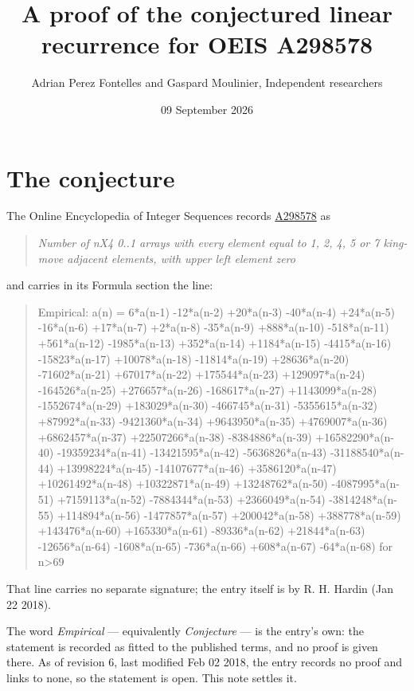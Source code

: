 \documentclass[11pt]{article}
\title{A proof of the conjectured linear recurrence for OEIS A298578}
\author{Adrian Perez Fontelles and Gaspard Moulinier, Independent researchers}
\date{09 September 2026}
\theoremstyle{definition}
\begin{document}
\maketitle
\section{The conjecture}

The Online Encyclopedia of Integer Sequences records \href{https://oeis.org/A298578}{A298578} as

\begin{quote}\itshape Number of nX4 0..1 arrays with every element equal to 1, 2, 4, 5 or 7 king-move adjacent elements, with upper left element zero\end{quote}

and carries in its Formula section the line:

\begin{quote}\ttfamily Empirical: a(n) = 6*a(n-1) -12*a(n-2) +20*a(n-3) -40*a(n-4) +24*a(n-5) -16*a(n-6) +17*a(n-7) +2*a(n-8) -35*a(n-9) +888*a(n-10) -518*a(n-11) +561*a(n-12) -1985*a(n-13) +352*a(n-14) +1184*a(n-15) -4415*a(n-16) -15823*a(n-17) +10078*a(n-18) -11814*a(n-19) +28636*a(n-20) -71602*a(n-21) +67017*a(n-22) +175544*a(n-23) +129097*a(n-24) -164526*a(n-25) +276657*a(n-26) -168617*a(n-27) +1143099*a(n-28) -1552674*a(n-29) +183029*a(n-30) -466745*a(n-31) -5355615*a(n-32) +87992*a(n-33) -9421360*a(n-34) +9643950*a(n-35) +4769007*a(n-36) +6862457*a(n-37) +22507266*a(n-38) -8384886*a(n-39) +16582290*a(n-40) -19359234*a(n-41) -13421595*a(n-42) -5636826*a(n-43) -31188540*a(n-44) +13998224*a(n-45) -14107677*a(n-46) +3586120*a(n-47) +10261492*a(n-48) +10322871*a(n-49) +13248762*a(n-50) -4087995*a(n-51) +7159113*a(n-52) -7884344*a(n-53) +2366049*a(n-54) -3814248*a(n-55) +114894*a(n-56) -1477857*a(n-57) +200042*a(n-58) +388778*a(n-59) +143476*a(n-60) +165330*a(n-61) -89336*a(n-62) +21844*a(n-63) -12656*a(n-64) -1608*a(n-65) -736*a(n-66) +608*a(n-67) -64*a(n-68) for n>69\end{quote}

That line carries no separate signature; the entry itself is by R. H. Hardin (Jan 22 2018).

The word {\itshape Empirical} --- equivalently {\itshape Conjecture} --- is the entry's own: the statement is recorded as fitted to the published terms, and no proof is given there. As of revision 6, last modified Feb 02 2018, the entry records no proof and links to none, so the statement is open. This note settles it.
\end{document}
